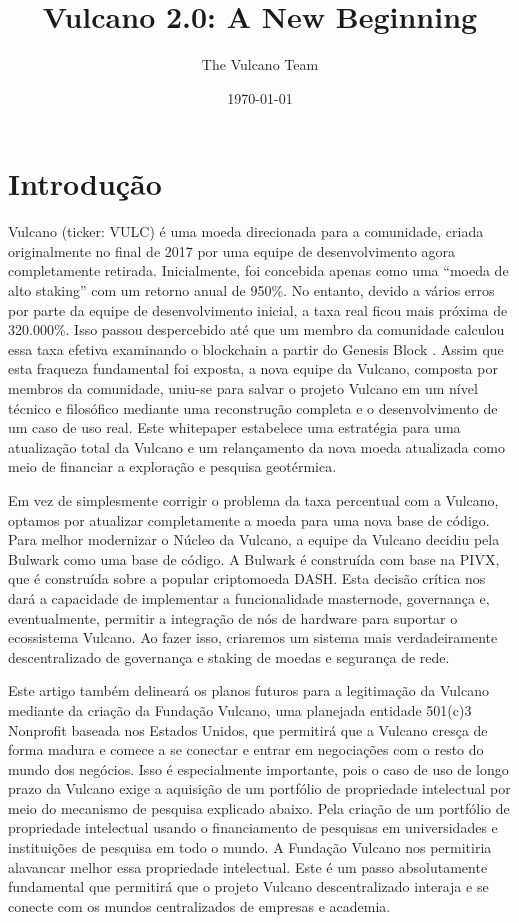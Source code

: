 \documentclass[A4paper, 12pt]{article}
\begin{document}
\title{Vulcano 2.0: A New Beginning}
\author{The Vulcano Team}
\date{\today}

\newpage
\tableofcontents
\newpage
\section{Introdução}

Vulcano (ticker:  VULC) é uma moeda direcionada para a comunidade, criada originalmente no final de 2017 por uma equipe de desenvolvimento agora completamente retirada. Inicialmente, foi concebida apenas como uma “moeda de alto staking” com um retorno anual de 950\%.  No entanto, devido a vários erros por parte da equipe de desenvolvimento inicial, a taxa real ficou mais próxima de 320.000\%. Isso passou despercebido até que um membro da comunidade calculou essa taxa efetiva examinando o blockchain a partir do Genesis Block . Assim que esta fraqueza fundamental foi exposta, a nova equipe da Vulcano, composta por membros da comunidade, uniu-se para salvar o projeto Vulcano em um nível técnico e filosófico mediante uma reconstrução completa e o desenvolvimento de um caso de uso real. Este whitepaper estabelece uma estratégia para uma atualização total da Vulcano e um relançamento da nova moeda atualizada como meio de financiar a exploração e pesquisa geotérmica.

Em vez de simplesmente corrigir o problema da taxa percentual com a Vulcano, optamos por atualizar completamente a moeda para uma nova base de código. Para melhor modernizar o Núcleo da Vulcano, a equipe da Vulcano decidiu pela Bulwark como uma base de código. A Bulwark é construída com base na PIVX, que é construída sobre a popular criptomoeda DASH.  Esta decisão crítica nos dará a capacidade de implementar a funcionalidade masternode, governança e, eventualmente, permitir a integração de nós de hardware para suportar o ecossistema Vulcano.  Ao fazer isso, criaremos um sistema mais verdadeiramente descentralizado de governança e staking de moedas e segurança de rede.

Este artigo também delineará os planos futuros para a legitimação da Vulcano mediante da criação da Fundação Vulcano, uma planejada entidade 501(c)3 Nonprofit baseada nos Estados Unidos, que permitirá que a Vulcano cresça de forma madura e comece a se conectar e entrar em negociações com o resto do mundo dos negócios. Isso é especialmente importante, pois o caso de uso de longo prazo da Vulcano exige a aquisição de um portfólio de propriedade intelectual por meio do mecanismo de pesquisa explicado abaixo. Pela criação de um portfólio de propriedade intelectual usando o financiamento de pesquisas em universidades e instituições de pesquisa em todo o mundo. A Fundação Vulcano nos permitiria alavancar melhor essa propriedade intelectual. Este é um passo absolutamente fundamental que permitirá que o projeto Vulcano descentralizado interaja e se conecte com os mundos centralizados de empresas e academia.
\end{document}
